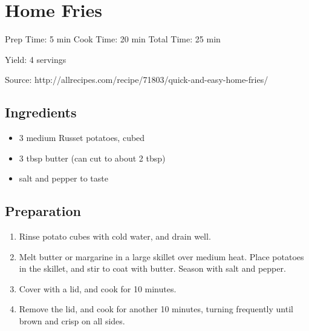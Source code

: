 \section{Home Fries}

\begin{center}
Prep Time: 5 min
Cook Time: 20 min
Total Time: 25 min

\noindent Yield: 4 servings

\vspace{1em}

Source: http://allrecipes.com/recipe/71803/quick-and-easy-home-fries/
\end{center}

\subsection{Ingredients}
\begin{multicols}{2}
\begin{itemize}
    \item 3 medium Russet potatoes, cubed
    \item 3 tbsp butter (can cut to about 2 tbsp)
    \item salt and pepper to taste
\end{itemize}
\end{multicols}

\subsection{Preparation}
\begin{enumerate}
    \item Rinse potato cubes with cold water, and drain well.
    \item Melt butter or margarine in a large skillet over medium heat. Place potatoes in the skillet, and stir to coat with butter. Season with salt and pepper.
    \item Cover with a lid, and cook for 10 minutes.
    \item Remove the lid, and cook for another 10 minutes, turning frequently until brown and crisp on all sides.
\end{enumerate}

